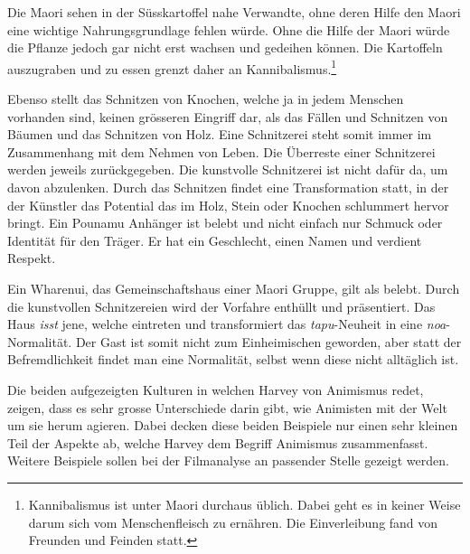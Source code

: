 Die Maori sehen in der Süsskartoffel nahe Verwandte, ohne deren Hilfe den Maori eine wichtige Nahrungsgrundlage fehlen würde. Ohne die Hilfe der Maori würde die Pflanze jedoch gar nicht erst wachsen und gedeihen können. Die Kartoffeln auszugraben und zu essen grenzt daher an Kannibalismus.\footnote{Kannibalismus ist unter Maori durchaus üblich. Dabei geht es in keiner Weise darum sich vom Menschenfleisch zu ernähren. Die Einverleibung fand von Freunden und Feinden statt.}

Ebenso stellt das Schnitzen von Knochen, welche ja in jedem Menschen vorhanden sind, keinen grösseren Eingriff dar, als das Fällen und Schnitzen von Bäumen und das Schnitzen von Holz. Eine Schnitzerei steht somit immer im Zusammenhang mit dem Nehmen von Leben. Die Überreste einer Schnitzerei werden jeweils zurückgegeben. Die kunstvolle Schnitzerei ist nicht dafür da, um davon abzulenken. Durch das Schnitzen findet eine Transformation statt, in der der Künstler das Potential das im Holz, Stein oder Knochen schlummert hervor bringt. Ein Pounamu Anhänger ist belebt und nicht einfach nur Schmuck oder Identität für den Träger. Er hat ein Geschlecht, einen Namen und verdient Respekt. 

Ein Wharenui, das Gemeinschaftshaus einer Maori Gruppe, gilt als belebt. Durch die kunstvollen Schnitzereien wird der Vorfahre enthüllt und präsentiert. Das Haus \emph{isst} jene, welche eintreten und transformiert das \emph{tapu}-Neuheit in eine \emph{noa}-Normalität. Der Gast ist somit nicht zum Einheimischen geworden, aber statt der Befremdlichkeit findet man eine Normalität, selbst wenn diese nicht alltäglich ist. 

\smallskip
Die beiden aufgezeigten Kulturen in welchen Harvey von Animismus redet, zeigen, dass es sehr grosse Unterschiede darin gibt, wie Animisten mit der Welt um sie herum agieren. Dabei decken diese beiden Beispiele nur einen sehr kleinen Teil der Aspekte ab, welche Harvey dem Begriff Animismus zusammenfasst. Weitere Beispiele sollen bei der Filmanalyse an passender Stelle gezeigt werden. 




